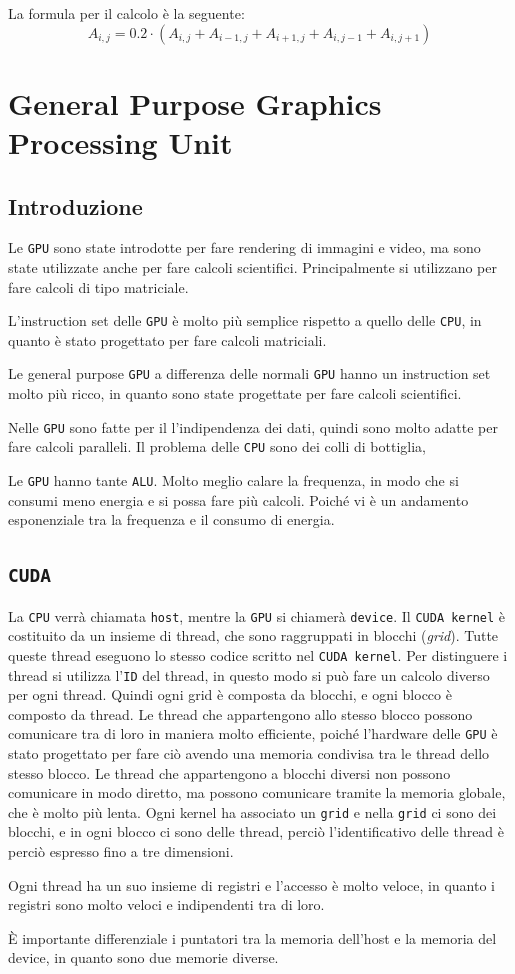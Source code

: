 La formula per il calcolo è la seguente:
\[
A_{i,j} = 0.2 \cdot (A_{i, j} + A_{i-1, j} + A_{i+1, j}
+ A_{i, j-1} + A_{i, j+1})  
\]


\chapter{General Purpose Graphics Processing Unit}
\section{Introduzione}
Le \texttt{GPU} sono state introdotte per fare
rendering di immagini
e video, ma sono state utilizzate anche per fare
calcoli scientifici.
Principalmente si utilizzano per fare calcoli di
tipo matriciale.

L'instruction set delle \texttt{GPU} è molto più
semplice rispetto
a quello delle \texttt{CPU}, in quanto è stato
progettato per fare
calcoli matriciali.

Le general purpose \texttt{GPU} a differenza delle normali \texttt{GPU}
hanno un instruction set molto più ricco, in quanto sono state progettate
per fare calcoli scientifici.

Nelle \texttt{GPU} sono fatte per il l'indipendenza dei dati, quindi
sono molto adatte per fare calcoli paralleli. 
Il problema delle \texttt{CPU} sono dei colli di bottiglia, 

Le \texttt{GPU} hanno tante \texttt{ALU}.
Molto meglio calare la frequenza, in modo che si consumi 
meno energia e si possa fare più calcoli.
Poiché vi è un andamento esponenziale tra la frequenza e il consumo
di energia. 

\section{\texttt{CUDA}}
La \texttt{CPU} verrà chiamata \texttt{host}, mentre la \texttt{GPU}
si chiamerà \texttt{device}.
Il \texttt{CUDA kernel} è costituito da un insieme di thread, che
sono raggruppati in blocchi (\textit{grid}).
Tutte queste thread eseguono lo stesso codice scritto nel 
\texttt{CUDA kernel}.
Per distinguere i thread si utilizza l'\texttt{ID} del thread, 
in questo modo si può fare un calcolo diverso per ogni thread.
Quindi ogni grid è composta da blocchi, e ogni blocco è composto
da thread. Le thread che appartengono allo stesso blocco 
possono comunicare tra di loro in maniera molto efficiente, poiché 
l'hardware delle \texttt{GPU} è stato progettato per fare ciò avendo una 
memoria condivisa tra le thread dello stesso blocco.
Le thread che appartengono a blocchi diversi non possono comunicare
in modo diretto, ma possono comunicare tramite la memoria globale, che 
è molto più lenta.
Ogni kernel ha associato un \texttt{grid} e nella \texttt{grid} ci sono
dei blocchi, e in ogni blocco ci sono delle thread, perciò l'identificativo 
delle thread è perciò espresso fino a tre dimensioni.

Ogni thread ha un suo insieme di registri e l'accesso 
è molto veloce, in quanto i registri sono molto veloci e 
indipendenti tra di loro.

È importante differenziale i puntatori tra la memoria dell'host e 
la memoria del device, in quanto sono due memorie diverse.

